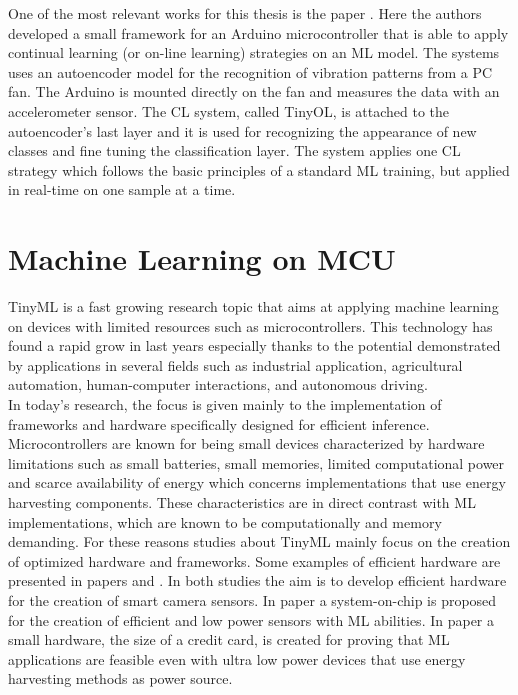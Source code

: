 \documentclass[12pt]{report}
\begin{document}
One of the most relevant works for this thesis is the paper \cite{ren2021tinyol}. Here the authors developed a small framework for an Arduino microcontroller that is able to apply continual learning (or on-line learning) strategies on an ML model. The systems uses an autoencoder model for the recognition of vibration patterns from a PC fan. The Arduino is mounted directly on the fan and measures the data with an accelerometer sensor. The CL system, called TinyOL, is attached to the autoencoder's last layer and it is used for recognizing the appearance of new classes and fine tuning the classification layer. The system applies one CL strategy which follows the basic principles of a standard ML training, but applied in real-time on one sample at a time. 

\section{Machine Learning on MCU}
TinyML is a fast growing research topic that aims at applying machine learning on devices with limited resources such as microcontrollers. This technology has found a rapid grow in last years especially thanks to the potential demonstrated by applications in several fields such as industrial application, agricultural automation, human-computer interactions, and autonomous driving. \\
In today's research, the focus is given mainly to the implementation of frameworks and hardware specifically designed for efficient inference. Microcontrollers are known for being small devices characterized by hardware limitations such as small batteries, small memories, limited computational power and scarce availability of energy which concerns implementations that use energy harvesting components. These characteristics are in direct contrast with ML implementations, which are known to be computationally and memory demanding. For these reasons studies about TinyML mainly focus on the creation of optimized hardware and frameworks. Some examples of efficient hardware are presented in papers \cite{jokic2021battery} and \cite{jokic2021sub}. In both studies the aim is to develop efficient hardware for the creation of smart camera sensors. In paper \cite{jokic2021sub} a system-on-chip is proposed for the creation of efficient and low power sensors with ML abilities. In paper \cite{jokic2021battery} a small hardware, the size of a credit card, is created for proving that ML applications are feasible even with ultra low power devices that use energy harvesting methods as power source.\\
\end{document}
